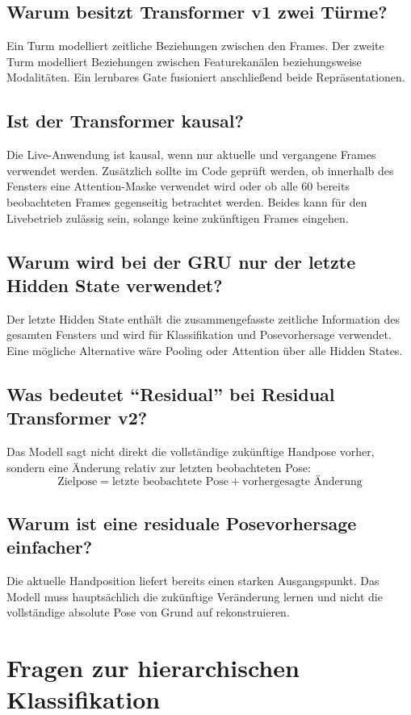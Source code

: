 \documentclass[11pt,a4paper]{article}
\begin{document}
\subsection*{Warum besitzt Transformer v1 zwei Türme?}
Ein Turm modelliert zeitliche Beziehungen zwischen den Frames. Der zweite Turm modelliert Beziehungen zwischen Featurekanälen beziehungsweise Modalitäten. Ein lernbares Gate fusioniert anschließend beide Repräsentationen.

\subsection*{Ist der Transformer kausal?}
Die Live-Anwendung ist kausal, wenn nur aktuelle und vergangene Frames verwendet werden. Zusätzlich sollte im Code geprüft werden, ob innerhalb des Fensters eine Attention-Maske verwendet wird oder ob alle 60 bereits beobachteten Frames gegenseitig betrachtet werden. Beides kann für den Livebetrieb zulässig sein, solange keine zukünftigen Frames eingehen.

\subsection*{Warum wird bei der GRU nur der letzte Hidden State verwendet?}
Der letzte Hidden State enthält die zusammengefasste zeitliche Information des gesamten Fensters und wird für Klassifikation und Posevorhersage verwendet. Eine mögliche Alternative wäre Pooling oder Attention über alle Hidden States.

\subsection*{Was bedeutet ``Residual'' bei Residual Transformer v2?}
Das Modell sagt nicht direkt die vollständige zukünftige Handpose vorher, sondern eine Änderung relativ zur letzten beobachteten Pose:
\[
\text{Zielpose}=\text{letzte beobachtete Pose}+\text{vorhergesagte Änderung}
\]

\subsection*{Warum ist eine residuale Posevorhersage einfacher?}
Die aktuelle Handposition liefert bereits einen starken Ausgangspunkt. Das Modell muss hauptsächlich die zukünftige Veränderung lernen und nicht die vollständige absolute Pose von Grund auf rekonstruieren.

\section{Fragen zur hierarchischen Klassifikation}
\end{document}
